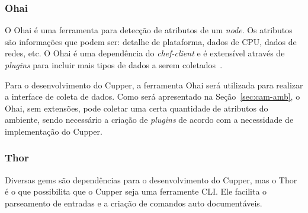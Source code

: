 \subsubsection{Ohai}
\label{sec:deps:ohai}

O Ohai é uma ferramenta para detecção de atributos de um \textit{node}. Os atributos são
informações que podem ser: detalhe de plataforma, dados de CPU, dados de redes, etc.
O Ohai é uma dependência do \textit{chef-client} e é extensível através de \textit{plugins}
para incluir mais tipos de dados a serem coletados~\cite{ohaidoc:2016}.

Para o desenvolvimento do Cupper, a ferramenta Ohai será utilizada para realizar a
interface de coleta de dados. Como será apresentado na Seção~\ref{sec:cam-amb}, o
Ohai, sem extensões, pode coletar uma certa quantidade de atributos do ambiente, sendo
necessário a criação de \textit{plugins} de acordo com a necessidade de implementação do Cupper.

\subsubsection{Thor}
\label{sec:deps:thor}

Diversas gems são dependências para o desenvolvimento do Cupper, mas o Thor
é o que possibilita que o Cupper seja uma ferramente CLI\@. Ele facilita o
parseamento de entradas e a criação de comandos auto documentáveis.
